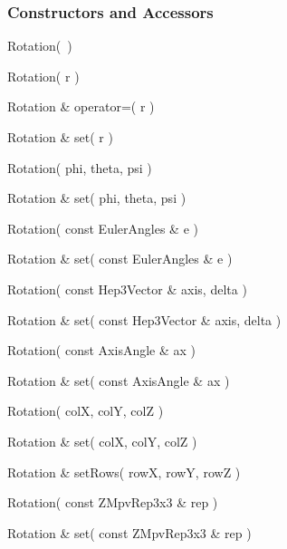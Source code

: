 \subsubsection{Constructors and Accessors}

\begin{shortlist}
  \item Rotation(~)

  \item Rotation( r )
  \item Rotation \& operator=( r )
  \item Rotation \& set( r )

  \item Rotation( phi, theta, psi )			\see{\ref{eq:eulerrot}}
  \item Rotation \& set( phi, theta, psi )		\see{\ref{eq:eulerrot}}

  \item Rotation( const EulerAngles \& e )		\see{\ref{eq:eulerrot}}
  \item Rotation \& set( const EulerAngles \& e )	\see{\ref{eq:eulerrot}}

  \item Rotation( const Hep3Vector \& axis, delta )	\see{\ref{eq:axisrot}}
  \item Rotation \& set( const Hep3Vector \& axis, delta ) \see{\ref{eq:axisrot}}

  \item Rotation( const AxisAngle \& ax )		\see{\ref{eq:axisrot}}
  \item Rotation \& set( const AxisAngle \& ax )	\see{\ref{eq:axisrot}}

  \item Rotation( colX, colY, colZ )  
  \item Rotation \& set( colX, colY, colZ )
  \item Rotation \& setRows( rowX, rowY, rowZ )

  \item Rotation( const ZMpvRep3x3 \& rep )
  \item Rotation \& set( const ZMpvRep3x3 \& rep )

\end{shortlist}

